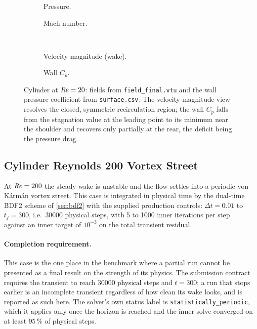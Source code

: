 \begin{figure}[htbp]
  \centering
  \begin{subfigure}{0.49\textwidth}\centering
    \caption{Pressure.}
  \end{subfigure}\hfill
  \begin{subfigure}{0.49\textwidth}\centering
    \caption{Mach number.}
  \end{subfigure}\\[6pt]
  \begin{subfigure}{0.49\textwidth}\centering
    \caption{Velocity magnitude (wake).}
  \end{subfigure}\hfill
  \begin{subfigure}{0.49\textwidth}\centering
    \caption{Wall $C_p$.}
  \end{subfigure}
  \caption{Cylinder at $\mathit{Re}=20$: fields from \texttt{field\_final.vtu} and the
  wall pressure coefficient from \texttt{surface.csv}. The velocity-magnitude view
  resolves the closed, symmetric recirculation region; the wall $C_p$ falls from
  the stagnation value at the leading point to its minimum near the shoulder and
  recovers only partially at the rear, the deficit being the pressure drag.}
  \label{fig:cyl20-field}
\end{figure}

\subsection{Cylinder Reynolds 200 Vortex Street}
\label{sec:cyl200}

At $\mathit{Re}=200$ the steady wake is unstable and the flow settles into a periodic
von K\'arm\'an vortex street. This case is integrated in physical time by the
dual-time BDF2 scheme of \cref{sec:bdf2} with the supplied production controls:
$\Delta t=0.01$ to $t_f=300$, i.e.\ $\num{30000}$ physical steps, with 5 to 1000
inner iterations per step against an inner target of $10^{-3}$ on the total
transient residual.

\paragraph{Completion requirement.} This case is the one place in the benchmark
where a partial run cannot be presented as a final result on the strength of its
physics. The submission contract requires the transient to reach
$\num{30000}$ physical steps and $t=300$; a run that stops earlier is an
incomplete transient regardless of how clean its wake looks, and is reported as
such here. The solver's own status label is
\texttt{statistically\_periodic}, which it applies only once the horizon is
reached and the inner solve converged on at least $95\,\%$ of physical steps.

